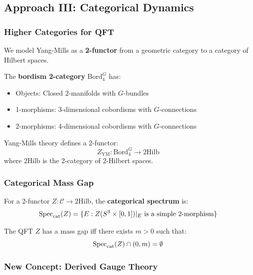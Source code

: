 \subsection{Approach III: Categorical Dynamics}

\subsubsection{Higher Categories for QFT}

We model Yang-Mills as a \textbf{2-functor} from a geometric category to a category of Hilbert spaces.

\begin{definition}
The \textbf{bordism 2-category} $\text{Bord}_4^G$ has:
\begin{itemize}
\item Objects: Closed 2-manifolds with $G$-bundles
\item 1-morphisms: 3-dimensional cobordisms with $G$-connections
\item 2-morphisms: 4-dimensional cobordisms with $G$-connections
\end{itemize}
\end{definition}

\begin{definition}
Yang-Mills theory defines a 2-functor:
\[
Z_{\text{YM}}: \text{Bord}_4^G \to \text{2Hilb}
\]
where $\text{2Hilb}$ is the 2-category of 2-Hilbert spaces.
\end{definition}

\subsubsection{Categorical Mass Gap}

\begin{definition}
For a 2-functor $Z: \mathcal{C} \to \text{2Hilb}$, the \textbf{categorical spectrum} is:
\[
\operatorname{Spec}_{\text{cat}}(Z) = \{E : Z(S^3 \times [0,1])|_E \text{ is a simple 2-morphism}\}
\]
\end{definition}

\begin{theorem}
The QFT $Z$ has a mass gap iff there exists $m > 0$ such that:
\[
\operatorname{Spec}_{\text{cat}}(Z) \cap (0, m) = \emptyset
\]
\end{theorem}

\subsubsection{New Concept: Derived Gauge Theory}

